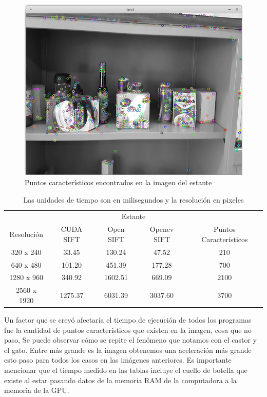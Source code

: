 \begin{figure}[ph]
			\centering
				\includegraphics[scale=0.75]{img/estante.png}
			\caption{Puntos característicos encontrados en la imagen del estante}
\end{figure}


\begin{table}[phtb]
\centering
\begin{tabular}{|c|c|c|c|c|}
\hline

\multicolumn{5}{|c|}{Estante} \\
\cline{1-5}
Resolución & CUDA SIFT & Open SIFT & Opencv SIFT & Puntos Característicos\\
\hline \hline
 320 x 240  & 33.45   & 130.24   & 47.52   & 210\\ \cline{1-5}
 640 x 480  & 101.20  &  451.39  & 177.28  & 700\\ \cline{1-5}
1280 x 960  & 340.92  &  1602.51 & 669.09  & 2100\\ \cline{1-5}
2560 x 1920 & 1275.37 &  6031.39 & 3037.60 & 3700\\ \cline{1-5}

\end{tabular}
\caption{Las unidades de tiempo son en milisegundos y la resolución en pixeles}
\label{tabla:final}
\end{table}


\pagebreak
Un factor que se creyó afectaría el tiempo de ejecución de todos los programas fue la cantidad de puntos característicos que existen en la imagen, cosa que no paso, Se puede observar cómo se repite el fenómeno que notamos con el castor y el gato. Entre más grande es la imagen obtenemos una aceleración más grande esto paso para todos los casos en las imágenes anteriores. Es importante mencionar que el tiempo medido en las tablas incluye el cuello de botella que existe al estar pasando datos de la memoria RAM de la computadora a la memoria de la GPU.     

